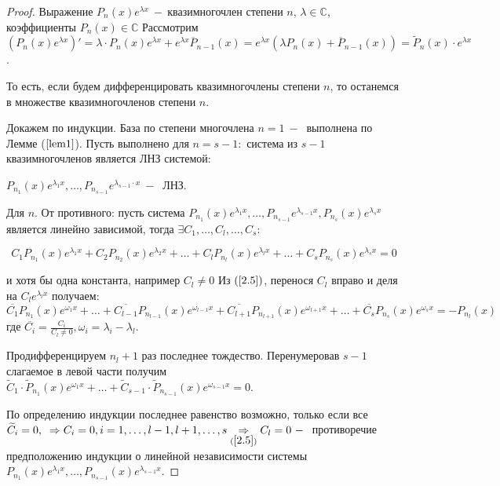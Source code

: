 \begin{proof}
    Выражение $P_n(x)e^{\lambda x}~-~$квазимногочлен степени $n$, $\lambda\in\mathds{C}$, коэффициенты $P_n(
    x)\in\mathds{C}$
    Рассмотрим $(P_n(x)e^{\lambda x})'=\lambda\cdot P_n(x)e^{\lambda x}+e^{\lambda x}\overline{P}_{n-1}(x)=e^{\lambda x }(\lambda P_n(x)+\overline{P}_{n-1}(x))= \widetilde{P}_n(x)\cdot e^{\lambda x}$.\par То есть, если будем дифференцировать квазимногочлены степени $n$, то останемся в множестве квазимногочленов степени $n$.\par
    Докажем по индукции. База по степени многочлена $n=1~-~$ выполнена по Лемме ($\ref{lem1}$). Пусть выполнено для $n=s-1:$ система из $s-1$ квазимногочленов является ЛНЗ системой:\par
    $P_{n_1}(x)e^{\lambda_1x}, \dots, P_{n_{s-1}}e^{\lambda_{s-1}\cdot x}~-~$ ЛНЗ.\par
    Для $n$. От противного: пусть система $P_{n_1}(x)e^{\lambda_1x}, \dots, P_{n_{s-1}}e^{\lambda_{s-1}x}, P_{n_s}(x)e^{\lambda_s x}$ является линейно зависимой, тогда $\exists C_1, \dots, C_l, \dots, C_s:$

    \begin{equation}
        \tag{2.5}
        \label{2.5}
        C_1P_{n_1}(x)e^{\lambda_1x}+C_2P_{n_2}(x)e^{\lambda_2x}+\dots+C_lP_{n_l}(x)e^{\lambda_lx}+\dots+C_sP_{n_s}(x)e^{\lambda_sx}=0
    \end{equation}

    и хотя бы одна константа, например $C_l\neq0$ Из $(\ref{2.5})$, перенося $C_l$ вправо и деля на $C_le^{\lambda_lx}$ получаем:
    $$\overline{C_1}P_{n_1}(x)e^{\omega_1x}+\dots+\overline{C_{l-1}}P_{n_{l-1}}(x)e^{\omega_{l-1}x}+\overline{C_{l+1}}P_{n_{l+1}}(x)e^{\omega_{l+1}x}+\dots+\overline{C_s}P_{n_s}(x)e^{\omega_sx}=-P_{n_l}(x)$$ где $\overline{C_i}=\frac{C_i}{C_l\neq0}, \omega_i=\lambda_i-\lambda_l$.\par Продифференцируем $n_{l}+1$ раз последнее тождество. Перенумеровав $s-1$ слагаемое в левой части получим $\widetilde{C}_1\cdot \widetilde{P}_{n_1}(x)e^{\omega_1x}+\dots+\widetilde{C}_{s-1} \cdot \widetilde{P}_{n_{s-1}}(x)e^{\omega_{s-1}x}=0$.\par По определению индукции последнее равенство возможно, только если  все $\widetilde{C}_i=0, \;\;\Rightarrow C_i =0, i=1, \dots, l-1, l+1, \dots, s\underset{(\ref{2.5})}{\Rightarrow} C_l=0~-~$ противоречие предположению индукции о линейной независимости системы $P_{n_1}(x)e^{\lambda_1x}, \dots, P_{n_{s-1}}(x)e^{\lambda_{s-1}x}$.
\end{proof}

